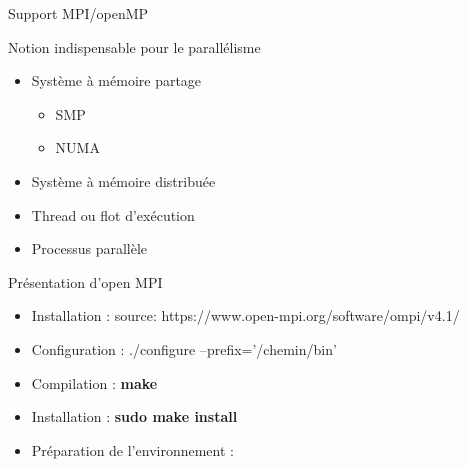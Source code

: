 \documentclass{beamer}
\begin{document}
\begin{frame}{Support MPI/openMP}
    \begin{block}{Notion indispensable pour le parallélisme}
      \begin{itemize}
          \item Système à mémoire partage
            \begin{itemize}
                \item SMP
                \item NUMA
            \end{itemize}
          \item Système à mémoire distribuée
          \item Thread ou flot d'exécution
          \item Processus
          \Calcul parallèle
      \end{itemize}
    \end{block}
    
    \begin{block}{Présentation d'open MPI}
      \begin{itemize}
          \item Installation : source: https://www.open-mpi.org/software/ompi/v4.1/
          \item Configuration : ./configure --prefix='/chemin/bin'
          \item Compilation : \textbf{make}
          \item Installation : \textbf{sudo make install}
          \item Préparation de l'environnement : 
      \end{itemize}
    \end{block}
\end{frame}
\end{document}
